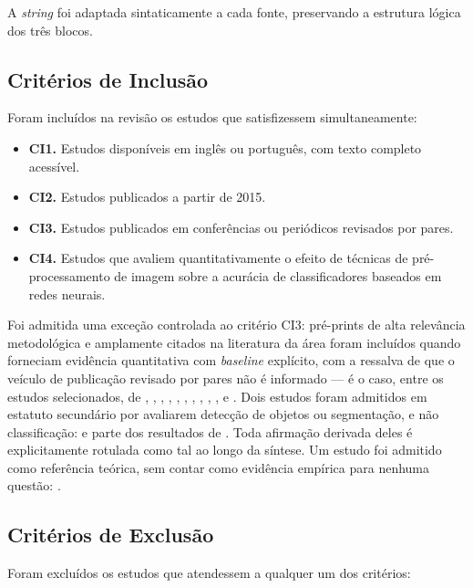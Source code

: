 \documentclass[conference]{IEEEtran}
\begin{document}
A \textit{string} foi adaptada sintaticamente a cada fonte, preservando a
estrutura lógica dos três blocos.

\subsection{Critérios de Inclusão}
\label{sec:ci}

Foram incluídos na revisão os estudos que satisfizessem simultaneamente:

\begin{itemize}
\item \textbf{CI1.} Estudos disponíveis em inglês ou português, com texto
completo acessível.
\item \textbf{CI2.} Estudos publicados a partir de 2015.
\item \textbf{CI3.} Estudos publicados em conferências ou periódicos revisados
por pares.
\item \textbf{CI4.} Estudos que avaliem quantitativamente o efeito de técnicas
de pré-processamento de imagem sobre a acurácia de classificadores baseados em
redes neurais.
\end{itemize}

Foi admitida uma exceção controlada ao critério CI3: pré-prints de alta
relevância metodológica e amplamente citados na literatura da área foram
incluídos quando forneciam evidência quantitativa com \textit{baseline}
explícito, com a ressalva de que o veículo de publicação revisado por pares não
é informado --- é o caso, entre os estudos selecionados, de
\cite{b1}, \cite{b2}, \cite{b4}, \cite{b5}, \cite{b7}, \cite{b8}, \cite{b9},
\cite{b11}, \cite{b20}, \cite{b22}, \cite{b26} e \cite{b27}. Dois estudos foram
admitidos em estatuto secundário por avaliarem detecção de objetos ou
segmentação, e não classificação: \cite{b13} e parte dos resultados de
\cite{b12}. Toda afirmação derivada deles é explicitamente rotulada como tal ao
longo da síntese. Um estudo foi admitido como referência teórica, sem contar
como evidência empírica para nenhuma questão: \cite{b3}.

\subsection{Critérios de Exclusão}
\label{sec:ce}

Foram excluídos os estudos que atendessem a qualquer um dos critérios:
\end{document}
